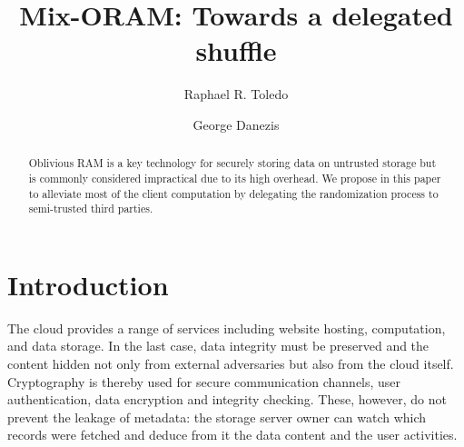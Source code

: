 \documentclass{llncs}
\begin{document}
\title{Mix-ORAM: Towards a delegated shuffle}
%
%
\author{Raphael R. Toledo \and George Danezis}
%
%
%

\maketitle              %

\begin{abstract}
Oblivious RAM is a key technology for securely storing data on untrusted storage but is commonly considered impractical due to its high overhead. We propose in this paper to  alleviate most of the client computation by delegating the randomization process to semi-trusted third parties.
\end{abstract}
%
\section{Introduction}\label{Introduction}
%
The cloud provides a range of services including website hosting, computation, and data storage. In the last case, data integrity must be preserved and the content hidden not only from external adversaries but also from the cloud itself.
Cryptography is thereby used for secure communication channels, user authentication, data encryption and integrity checking.
These, however, do not prevent the leakage of metadata: the storage server owner can watch which records were fetched and deduce from it the data content and the user activities. 
\end{document}
